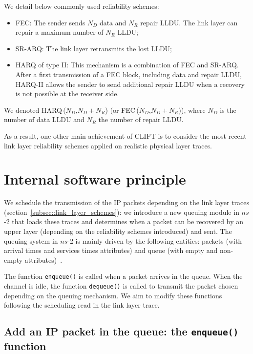 \documentclass[conference,letterpaper]{IEEEtran}
\begin{document}
We detail below commonly used reliability schemes:
\begin{itemize}
\item FEC: The sender sends $N_D$ data and $N_R$ repair LLDU. The link layer can repair a maximum number of $N_R$ LLDU;
\item SR-ARQ: The link layer retransmits the lost LLDU;
\item HARQ of type II: This mechanism is a combination of FEC and SR-ARQ. After a first transmission of a FEC block, including data and repair LLDU, HARQ-II allows the sender to send additional repair LLDU when a recovery is not possible at the receiver side.
\end{itemize}
We denoted HARQ\,($N_D$,$N_D+N_R$) (or FEC\,($N_D$,$N_D+N_R$)), where $N_D$ is the number of data LLDU and $N_R$ the number of repair LLDU.

As a result, one other main achievement of CLIFT is to consider the most recent link layer reliability schemes applied on realistic physical layer traces.









\section{Internal software principle}
\label{sec::ns2}

We schedule the transmission of the IP packets depending on the link layer traces (section~\ref{subsec::link_layer_schemes}): we introduce a new queuing module in $ns$-2 that loads these traces and determines when a packet can be recovered by an upper layer (depending on the reliability schemes introduced) and sent. The queuing system in $ns$-2 is mainly driven by the following entities: packets (with arrival times and services times attributes) and queue (with empty and non-empty attributes)~\cite{ns2_manual}.

The function \texttt{enqueue()} is called when a packet arrives in the queue. When the channel is idle, the function \texttt{dequeue()} is called to transmit the packet chosen depending on the queuing mechanism. We aim to modify these functions following the scheduling read in the link layer trace.

\subsection{Add an IP packet in the queue: the \texttt{enqueue()} function}
\label{subsec::n2_enque}
\end{document}
